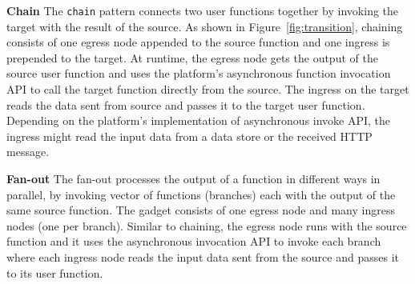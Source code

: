 \noindent\textbf{Chain}
The \texttt{chain} pattern connects two
user functions together by invoking the target with the result of the source.
As shown in Figure~\ref{fig:transition}, chaining consists of one egress node 
appended to the source function and one ingress is prepended to the target.
At runtime, the egress node gets the output of the source user function
and uses the platform's asynchronous function invocation API to call the
target function directly from the source. The ingress on the target reads the
data sent from source and passes it to the target user function. Depending on
the platform's implementation of asynchronous invoke API, the ingress might
read the input data from a data store or the received HTTP message.


\noindent\textbf{Fan-out}
The fan-out processes the output of a function in different
ways in parallel, by 
invoking vector of functions (branches) each with the output of the same
source function. The gadget consists of one egress node and many ingress
nodes (one per branch). Similar to chaining, the egress node runs with the
source function and it uses the asynchronous invocation API to invoke each
branch where each ingress node 
reads the input data sent from the source and passes it to its user function.













